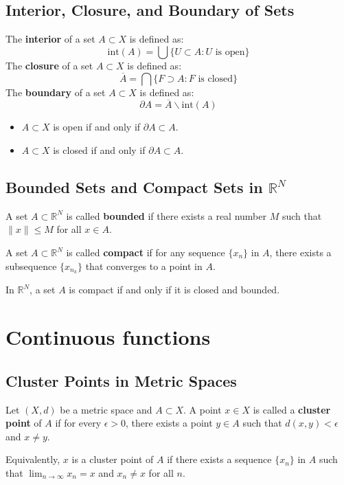 \subsection{Interior, Closure, and Boundary of Sets}
\begin{definition}
    The \textbf{interior} of a set $A \subset X$ is defined as: $$\text{int}(A) = \bigcup \{U \subset A: U \text{ is open}\}$$
    The \textbf{closure} of a set $A \subset X$ is defined as: $$\overline{A} = \bigcap \{F \supset A: F \text{ is closed}\}$$
    The \textbf{boundary} of a set $A \subset X$ is defined as: $$\partial A = \overline{A} \backslash \text{int}(A)$$
\end{definition}

\begin{theorem}
    \begin{itemize}
        \item $A \subset X$ is open if and only if $\partial A \subset A$.
        \item $A \subset X$ is closed if and only if $\partial A \subset A$.
    \end{itemize}
\end{theorem}
\subsection{Bounded Sets and Compact Sets in $\mathbb{R}^N$}
\begin{definition}
    A set $A \subset \mathbb{R}^N$ is called \textbf{bounded} if there exists a real number $M$ such that $\|x\| \leq M$ for all $x \in A$.

    A set $A \subset \mathbb{R}^N$ is called \textbf{compact} if for any sequence $\{x_n\}$ in $A$, there exists a subsequence $\{x_{n_k}\}$ that converges to a point in $A$.
\end{definition}

\begin{theorem} 
    In $\mathbb{R}^N$, a set $A$ is compact if and only if it is closed and bounded.
\end{theorem}

\section{Continuous functions}
\subsection{Cluster Points in Metric Spaces}
\begin{definition}
    Let $(X,d)$ be a metric space and $A \subset X$. A point $x \in X$ is called a \textbf{cluster point} of $A$ if for every $\epsilon > 0$, there exists a point $y \in A$ such that $d(x,y) < \epsilon$ and $x \neq y$.

    Equivalently, $x$ is a cluster point of $A$ if there exists a sequence $\{x_n\}$ in $A$ such that $\lim_{n \rightarrow \infty} x_n = x$ and $x_n \neq x$ for all $n$.
\end{definition}

